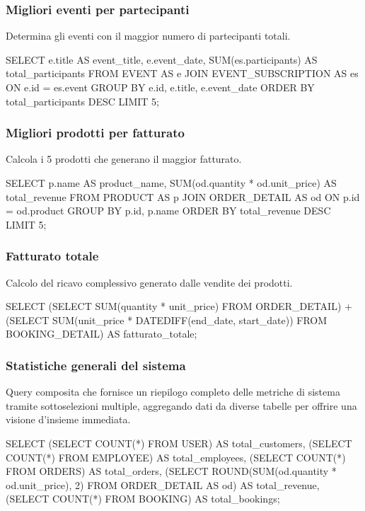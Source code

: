 \documentclass[a4paper,12pt]{report}
\begin{document}
\newpage
\subsubsection{Migliori eventi per partecipanti}
Determina gli eventi con il maggior numero di partecipanti totali.

\begin{sqlcode}[caption={}]
SELECT
  e.title AS event_title,
  e.event_date,
  SUM(es.participants) AS total_participants
FROM EVENT AS e
JOIN EVENT_SUBSCRIPTION AS es ON e.id = es.event
GROUP BY e.id, e.title, e.event_date
ORDER BY total_participants DESC
LIMIT 5;
\end{sqlcode}

\subsubsection{Migliori prodotti per fatturato}
Calcola i 5 prodotti che generano il maggior fatturato.

\begin{sqlcode}[caption={}]
SELECT
  p.name AS product_name,
  SUM(od.quantity * od.unit_price) AS total_revenue
FROM PRODUCT AS p
JOIN ORDER_DETAIL AS od ON p.id = od.product
GROUP BY p.id, p.name
ORDER BY total_revenue DESC
LIMIT 5;
\end{sqlcode}

\subsubsection{Fatturato totale}
Calcolo del ricavo complessivo generato dalle vendite dei prodotti.

\begin{sqlcode}[caption={}]
SELECT
    (SELECT SUM(quantity * unit_price) FROM ORDER_DETAIL)
  + (SELECT SUM(unit_price * DATEDIFF(end_date, start_date)) FROM BOOKING_DETAIL)
  AS fatturato_totale;
\end{sqlcode}

\subsubsection{Statistiche generali del sistema}
Query composita che fornisce un riepilogo completo delle metriche di
sistema tramite sottoselezioni multiple, aggregando dati da diverse
tabelle per offrire una visione d'insieme immediata.

\begin{sqlcode}[caption={}]
SELECT
  (SELECT COUNT(*) FROM USER) AS total_customers,
  (SELECT COUNT(*) FROM EMPLOYEE) AS total_employees,
  (SELECT COUNT(*) FROM ORDERS) AS total_orders,
  (SELECT ROUND(SUM(od.quantity * od.unit_price), 2) FROM ORDER_DETAIL AS od) AS total_revenue,
  (SELECT COUNT(*) FROM BOOKING) AS total_bookings;
\end{sqlcode}
\end{document}

